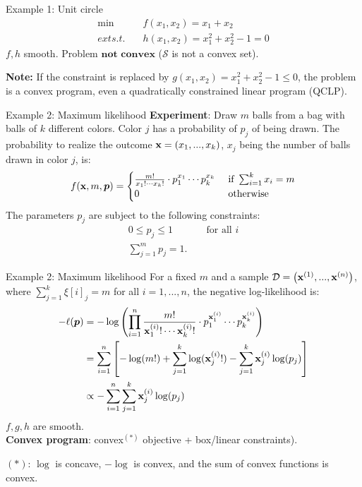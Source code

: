 \documentclass[11pt,compress,t,notes=noshow, xcolor=table]{beamer}
\begin{document}
\begin{frame2}{Example 1: Unit circle}
$$
\begin{aligned}
\min \quad & f(x_1, x_2) = x_1 + x_2 \\
ext{s.t. } \quad & h(x_1,x_2) = x_1^2 + x_2^2 - 1 = 0
\end{aligned}
$$
$f, h$ smooth. Problem $\textbf{not convex}$ ($\mathcal{S}$ is not a convex set).\\
\spacer
\begin{footnotesize}
\textbf{Note: } If the constraint is replaced by $g(x_1, x_2) = x_1^2 + x_2^2 - 1 \le 0$, the problem is a convex program, even a quadratically constrained linear program (QCLP).
\end{footnotesize}
\end{frame2}


\begin{frame2}{Example 2: Maximum likelihood}
\textbf{Experiment}: Draw $m$ balls from a bag with balls of $k$ different colors.
Color $j$ has a probability of $p_j$ of being drawn.
\spacer
The probability to realize the outcome $\xv = (x_1, ..., x_k)$, $x_j$ being the number of balls drawn in color $j$, is:
$$
f(\xv, m, \bm{p}) = \begin{cases} \frac{m!}{x_1! \cdots x_k!} \cdot p_1^{x_1} \cdots p_k^{x_k} & \text{ if } \sum_{i = 1}^k x_i = m \\ 0 & \text{ otherwise}\end{cases}
$$
The parameters $p_j$ are subject to the following constraints:
$$
\begin{aligned}
0 \le p_j \le 1 && \text{ for all } i \\
\sum_{j = 1}^m p_j = 1. &&
\end{aligned}
$$
\end{frame2}


\begin{frame2}{Example 2: Maximum likelihood}
For a fixed $m$ and a sample $\D = \left(\xi[1], ..., \xi[n]\right)$, where $\sum_{j = 1}^k \xi[i]_j = m$ for all $i = 1, ..., n$, the negative log-likelihood is:
$$
\begin{aligned}
- \ell(\bm{p}) &= - \log \left(\prod_{i = 1}^n  \frac{m!}{\xi_1! \cdots \xi_k!} \cdot p_1^{\xi_1} \cdots p_k^{\xi_k}    \right) \\
&= \sumin \left[- \log(m!) + \sum_{j = 1}^k \log(\xi_j!) - \sum_{j = 1}^k \xi_j \log(p_j)\right] \\
&\propto - \sumin \sum_{j = 1}^k \xi_j \log(p_j)
\end{aligned}
$$
$f, g, h$ are smooth.\\\textbf{Convex program}: convex$^{(*)}$ objective + box/linear constraints).
\vfill
\begin{footnotesize}
${(*)}$: $\log$ is concave, $- \log $ is convex, and the sum of convex functions is convex.
\end{footnotesize}
\end{frame2}
\end{document}
